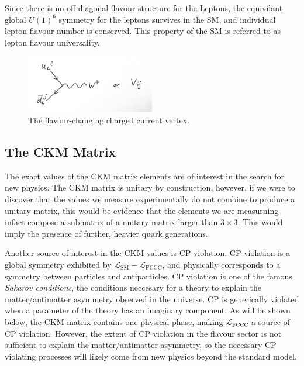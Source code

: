 Since there is no off-diagonal flavour structure for the Leptons, the equivilant global $U(1)^6$ symmetry for the leptons survives in the SM, and individual lepton flavour number is conserved. This property of the SM is referred to as lepton flavour universality.

\begin{figure}
  \begin{center}
    \vspace{-10pt}
    \includegraphics[width=0.5\textwidth]{images/fccc.jpg}
    \vspace{-10pt}
  \end{center}
  \caption{The flavour-changing charged current vertex.}
  \label{fig:fccc}
\end{figure}

\subsection{The CKM Matrix}

The exact values of the CKM matrix elements are of interest in the search for new physics. The CKM matrix is unitary by construction, however, if we were to discover that the values we measure experimentally do not combine to produce a unitary matrix, this would be evidence that the elements we are measurning infact compose a submatrix of a unitary matrix larger than $3\times 3$. This would imply the presence of further, heavier quark generations.

Another source of interest in the CKM values is CP violation. CP violation is a global symmetry exhibited by $\mathcal{L}_{\text{SM}}-\mathcal{L}_{\text{FCCC}}$, and physically corresponds to a symmetry between particles and antiparticles. CP violation is one of the famous {\it{Sakarov conditions}}, the conditions neccesary for a theory to explain the matter/antimatter asymmetry observed in the universe. CP is generically violated when a parameter of the theory has an imaginary component. As will be shown below, the CKM matrix contains one physical phase, making $\mathcal{L}_{\text{FCCC}}$ a source of CP violation. However, the extent of CP violation in the flavour sector is not sufficient to explain the matter/antimatter asymmetry, so the necessary CP violating processes will likely come from new physics beyond the standard model.


